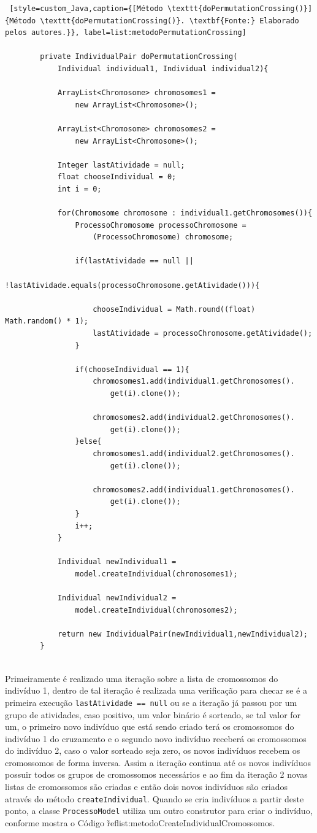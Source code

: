 \begin{lstlisting} [style=custom_Java,caption={[Método \texttt{doPermutationCrossing()}]{Método \texttt{doPermutationCrossing()}. \textbf{Fonte:} Elaborado pelos autores.}}, label=list:metodoPermutationCrossing] 

		private IndividualPair doPermutationCrossing(
			Individual individual1, Individual individual2){
			
			ArrayList<Chromosome> chromosomes1 = 
				new ArrayList<Chromosome>();
				
			ArrayList<Chromosome> chromosomes2 = 
				new ArrayList<Chromosome>();
				
			Integer lastAtividade = null;
			float chooseIndividual = 0;
			int i = 0;
			
			for(Chromosome chromosome : individual1.getChromosomes()){
				ProcessoChromosome processoChromosome = 
					(ProcessoChromosome) chromosome;
				
				if(lastAtividade == null || 
					!lastAtividade.equals(processoChromosome.getAtividade())){
					
					chooseIndividual = Math.round((float) Math.random() * 1);
					lastAtividade = processoChromosome.getAtividade();
				}
				
				if(chooseIndividual == 1){
					chromosomes1.add(individual1.getChromosomes().
						get(i).clone());
						
					chromosomes2.add(individual2.getChromosomes().
						get(i).clone());
				}else{
					chromosomes1.add(individual2.getChromosomes().
						get(i).clone());
						
					chromosomes2.add(individual1.getChromosomes().
						get(i).clone());
				}
				i++;
			}
			
			Individual newIndividual1 = 
				model.createIndividual(chromosomes1);
				
			Individual newIndividual2 = 
				model.createIndividual(chromosomes2);
			
			return new IndividualPair(newIndividual1,newIndividual2);
		}
	

\end{lstlisting}

\par Primeiramente é realizado uma iteração sobre a lista de cromossomos do indivíduo 1, dentro
de tal iteração é realizada uma verificação para checar se é a primeira execução \texttt{lastAtividade == null}
ou se a iteração já passou por um grupo de atividades, caso positivo, um valor binário é sorteado, se tal valor
for um, o primeiro novo indivíduo que está sendo criado terá os cromossomos do indivíduo 1 do cruzamento e o 
segundo novo indivíduo receberá os cromossomos do indivíduo 2, caso o valor sorteado seja zero, os novos indivíduos
recebem os cromossomos de forma inversa. Assim a iteração continua até os novos indivíduos possuir todos os grupos
de cromossomos necessários e ao fim da iteração 2 novas listas de cromossomos são criadas e então dois novos indivíduos são criados
através do método \texttt{createIndividual}. Quando se cria indivíduos a partir deste ponto, a classe \texttt{ProcessoModel} utiliza
um outro construtor para criar o indivíduo, conforme mostra o Código \~ref{list:metodoCreateIndividualCromossomos}.


